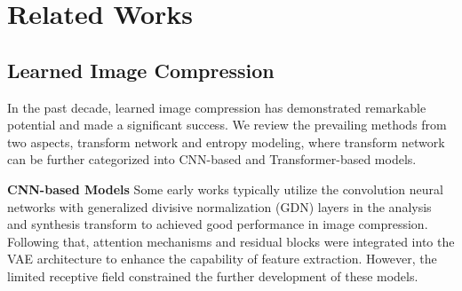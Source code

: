 \section{Related Works}
\label{sec:related}


\subsection{Learned Image Compression}

In the past decade, learned image compression has demonstrated remarkable potential and made a significant success. We review the prevailing methods from two aspects, transform network and entropy modeling, where transform network can be further categorized into CNN-based and Transformer-based models.


\noindent\textbf{CNN-based Models} Some early works typically utilize the convolution neural networks with generalized divisive normalization (GDN) layers \cite{Balle17, Balle.2018.Hyperprior, Minnen.2018.Joint} in the analysis and synthesis transform to achieved good performance in image compression. Following that, attention mechanisms and residual blocks \cite{Cheng.2020.LIC, Zhou.2019.EOI} were integrated into the VAE architecture to enhance the capability of feature extraction. However, the limited receptive field constrained the further development of these models.





